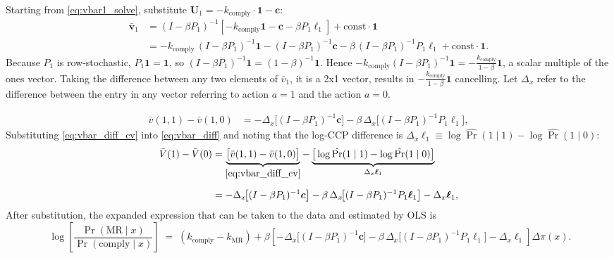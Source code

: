 \documentclass{article}
\begin{document}
Starting from \eqref{eq:vbar1_solve}, substitute
$\boldsymbol{U}_1 = -k_{\text{comply}}\cdot\mathbf{1} - \boldsymbol{c}$:
%
\begin{align}
\boldsymbol{\bar v}_1
  &= (I-\beta P_1)^{-1}
     \!\left[-k_{\text{comply}}\mathbf{1} - \boldsymbol{c}
             - \beta P_1\boldsymbol{\ell}_1\right]
     + \text{const}\cdot\mathbf{1}
\label{eq:vbar1_expand}\\[4pt]
%
  &= -k_{\text{comply}}\,(I-\beta P_1)^{-1}\mathbf{1}
     -(I-\beta P_1)^{-1}\boldsymbol{c}
     -\beta\,(I-\beta P_1)^{-1}P_1\boldsymbol{\ell}_1
     + \text{const}\cdot\mathbf{1}.
\label{eq:vbar1_decomp}
\end{align}
%
Because $P_1$ is row-stochastic, $P_1\mathbf{1}=\mathbf{1}$, so
$(I-\beta P_1)^{-1}\mathbf{1} = (1-\beta)^{-1}\mathbf{1}$. Hence
$-k_{\text{comply}}(I-\beta P_1)^{-1}\mathbf{1}
= -\tfrac{k_{\text{comply}}}{1-\beta}\mathbf{1}$,
a scalar multiple of the ones vector. Taking the difference between any two elements of $\bar v_1$, it is a 2x1 vector, results in $-\tfrac{k_{\text{comply}}}{1-\beta}\mathbf{1}$ cancelling. Let $\Delta_x$ refer to the difference between the entry in any vector referring to action $a=1$ and the action $a=0$.

%
\begin{align}
\bar v(1,1)-\bar v(1,0)
  &= -\Delta_x\!\big[(I-\beta P_1)^{-1}\boldsymbol{c}\big]
     -\beta\,\Delta_x\!\big[(I-\beta P_1)^{-1}P_1\boldsymbol{\ell}_1\big],
\label{eq:vbar_diff_cv}
\end{align}
%
Substituting \eqref{eq:vbar_diff_cv} into \eqref{eq:vbar_diff} and
noting that the log-CCP difference is $\Delta_x\boldsymbol{\ell}_1
\equiv \log\hat{\Pr}(1\mid 1)-\log\hat{\Pr}(1\mid 0)$:
%
\begin{align}
\bar V(1)-\bar V(0)
  &= \underbrace{\big[\bar v(1,1)-\bar v(1,0)\big]}_{\eqref{eq:vbar_diff_cv}}
     -\underbrace{\big[\log\hat{\Pr}(1\mid 1)-\log\hat{\Pr}(1\mid 0)\big]}_{\Delta_x\boldsymbol{\ell}_1}
\nonumber\\[6pt]
  &= -\Delta_x\!\big[(I-\beta P_1)^{-1}\boldsymbol{c}\big]
     -\beta\,\Delta_x\!\big[(I-\beta P_1)^{-1}P_1\boldsymbol{\ell}_1\big]
     -\Delta_x\boldsymbol{\ell}_1,
\end{align}
%
After substitution, the expanded expression that can be taken to the data and estimated by OLS is
\begin{equation}
    \;
\log \!\left[ \frac{\Pr(\text{MR} \mid x)}{\Pr(\text{comply} \mid x)} \right]
\;=\; (k_{\text{comply}}-k_{\text{MR}})+\beta \left[-\Delta_x\!\big[(I-\beta P_1)^{-1}\boldsymbol{c}\big]
     -\beta\,\Delta_x\!\big[(I-\beta P_1)^{-1}P_1\boldsymbol{\ell}_1\big]
     -\Delta_x\boldsymbol{\ell}_1\right]\Delta\pi(x).
\label{eq:finalest}
\end{equation}
\end{document}
